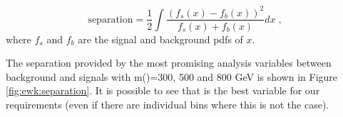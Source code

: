 \begin{equation}
          \mathrm{separation} = \frac{1}{2} \int\frac{\left(f_s(x) - f_b(x)\right)^2}{f_s(x) + f_b(x)} dx \; , 
\label{eq:separation}
\end{equation}
\noindent where $f_s$ and $f_b$ are the signal and background \glspl{pdf} of $x$. 

The separation provided by the most promising analysis variables between background and 
signals with m(\hino)=300, 500 and 800 GeV is shown in Figure \ref{fig:ewk:separation}.
It is possible to see that \meffb is the best variable for our requirements (even if there are individual bins where this is not the case). 

\begin{figure}[htpb]
\begin{center}
\\
\\

\end{center}
\end{figure}
